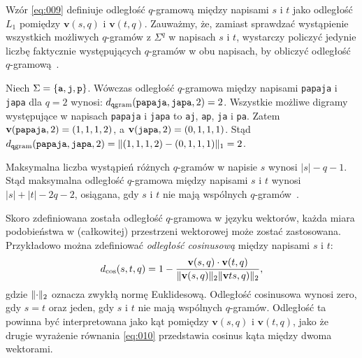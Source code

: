\documentclass{praca1}
\DeclarePairedDelimiter{\norm}{\lVert}{\rVert}
\begin{document}
Wzór \ref{eq:009} definiuje odległość $q$-gramową między napisami $s$ i $t$ jako odległość $L_1$ pomiędzy $\mathbf{v}(s,q)$ i $\mathbf{v}(t,q)$. Zauważmy, że, zamiast sprawdzać wystąpienie wszystkich możliwych $q$-gramów z $\Sigma^q$ w napisach $s$ i $t$, wystarczy policzyć jedynie liczbę faktycznie występujących $q$-gramów w obu napisach, by obliczyć odległość $q$-gramową~\cite{Loo2014:stringdist}.

\begin{example}
\label{ex:001}
Niech $\Sigma = \{\verb|a|, \verb|j|, \verb|p|\}$. Wówczas odległość $q$-gramowa między napisami \verb|papaja| i \verb|japa| dla $q = 2$ wynosi: $d_{\mathtt{q}\mathrm{gram}}(\verb|papaja|, \verb|japa|, 2) = 2$. Wszystkie możliwe digramy występujące w napisach  \verb|papaja| i \verb|japa| to \verb|aj|, \verb|ap|, \verb|ja| i \verb|pa|. Zatem $\mathbf{v}( \verb|papaja|,2) = (1, 1, 1, 2)$, a  $\mathbf{v}( \verb|japa|,2) = (0, 1, 1, 1)$. Stąd $d_{\mathtt{q}\mathrm{gram}}(\verb|papaja|, \verb|japa|, 2) =  \norm{(1,1,1,2) - (0,1,1,1)}_1 = 2$.
\end{example}


Maksymalna liczba wystąpień różnych $q$-gramów w napisie $s$ wynosi $|s| - q - 1$. Stąd maksymalna odległość $q$-gramowa między napisami $s$ i $t$ wynosi $|s| + |t| - 2q - 2$, osiągana, gdy $s$ i $t$ nie mają wspólnych $q$-gramów~\cite{Loo2014:stringdist}.

Skoro zdefiniowana została odległość $q$-gramowa w języku wektorów, każda miara podobieństwa w (całkowitej) przestrzeni wektorowej może zostać zastosowana. Przykładowo można zdefiniować \emph{odległość cosinusową} między napisami $s$ i $t$:
\begin{equation}
\label{eq:010}
d_{\mathrm{cos}}(s,t,q) = 1 - \frac{ \mathbf{v}(s,q) \cdot \mathbf{v}(t,q) }{ \norm{\mathbf{v}(s,q)}_2  \norm{\mathbf{v}ts,q)}_2 },
\end{equation}
gdzie $\norm{\cdot}_2$ oznacza zwykłą normę Euklidesową. Odległość cosinusowa wynosi zero, gdy $s=t$ oraz jeden, gdy $s$ i $t$ nie mają wspólnych $q$-gramów. Odległość ta powinna być interpretowana jako kąt pomiędzy $\mathbf{v}(s,q)$ i $\mathbf{v}(t,q)$, jako że drugie wyrażenie równania \ref{eq:010} przedstawia cosinus kąta między dwoma wektorami.
\end{document}
